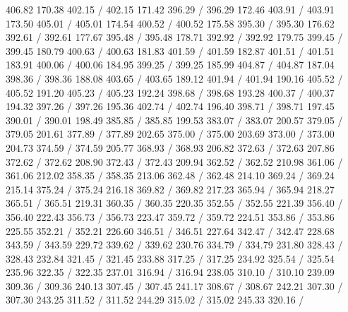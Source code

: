 { 406.82 170.38 402.15 /
 402.15 171.42 396.29 /
 396.29 172.46 403.91 /
 403.91 173.50 405.01 /
 405.01 174.54 400.52 /
 400.52 175.58 395.30 /
 395.30 176.62 392.61 /
 392.61 177.67 395.48 /
 395.48 178.71 392.92 /
 392.92 179.75 399.45 /
 399.45 180.79 400.63 /
 400.63 181.83 401.59 /
 401.59 182.87 401.51 /
 401.51 183.91 400.06 /
 400.06 184.95 399.25 /
 399.25 185.99 404.87 /
 404.87 187.04 398.36 /
 398.36 188.08 403.65 /
 403.65 189.12 401.94 /
 401.94 190.16 405.52 /
 405.52 191.20 405.23 /
 405.23 192.24 398.68 /
 398.68 193.28 400.37 /
 400.37 194.32 397.26 /
 397.26 195.36 402.74 /
 402.74 196.40 398.71 /
 398.71 197.45 390.01 /
 390.01 198.49 385.85 /
 385.85 199.53 383.07 /
 383.07 200.57 379.05 /
 379.05 201.61 377.89 /
 377.89 202.65 375.00 /
 375.00 203.69 373.00 /
 373.00 204.73 374.59 /
 374.59 205.77 368.93 /
 368.93 206.82 372.63 /
 372.63 207.86 372.62 /
 372.62 208.90 372.43 /
 372.43 209.94 362.52 /
 362.52 210.98 361.06 /
 361.06 212.02 358.35 /
 358.35 213.06 362.48 /
 362.48 214.10 369.24 /
 369.24 215.14 375.24 /
 375.24 216.18 369.82 /
 369.82 217.23 365.94 /
 365.94 218.27 365.51 /
 365.51 219.31 360.35 /
 360.35 220.35 352.55 /
 352.55 221.39 356.40 /
 356.40 222.43 356.73 /
 356.73 223.47 359.72 /
 359.72 224.51 353.86 /
 353.86 225.55 352.21 /
 352.21 226.60 346.51 /
 346.51 227.64 342.47 /
 342.47 228.68 343.59 /
 343.59 229.72 339.62 /
 339.62 230.76 334.79 /
 334.79 231.80 328.43 /
 328.43 232.84 321.45 /
 321.45 233.88 317.25 /
 317.25 234.92 325.54 /
 325.54 235.96 322.35 /
 322.35 237.01 316.94 /
 316.94 238.05 310.10 /
 310.10 239.09 309.36 /
 309.36 240.13 307.45 /
 307.45 241.17 308.67 /
 308.67 242.21 307.30 /
 307.30 243.25 311.52 /
 311.52 244.29 315.02 /
 315.02 245.33 320.16 /
}
